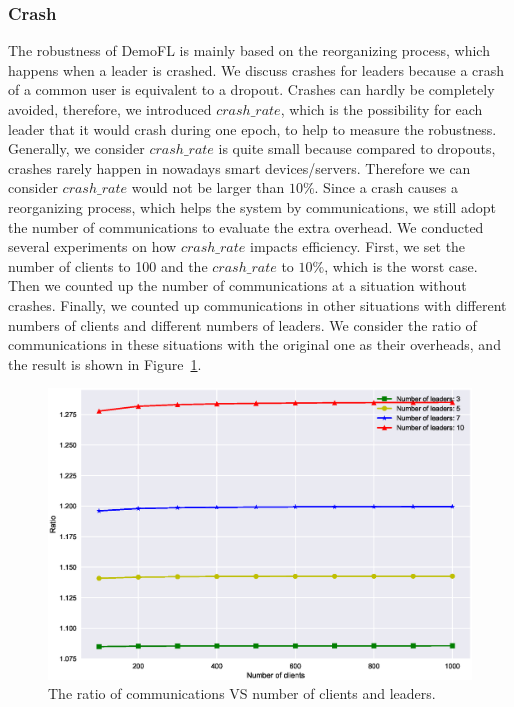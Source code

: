 \subsubsection{Crash}
The robustness of DemoFL is mainly based on the reorganizing process, which happens when a leader is crashed. We discuss crashes for leaders because a crash of a common user is equivalent to a dropout. Crashes can hardly be completely avoided, therefore, we introduced $crash\_rate$, which is the possibility for each leader that it would crash during one epoch, to help to measure the robustness. Generally, we consider $crash\_rate$ is quite small because compared to dropouts, crashes rarely happen in nowadays smart devices/servers. Therefore we can consider $crash\_rate$ would not be larger than $10\%$. Since a crash causes a reorganizing process, which helps the system by communications, we still adopt the number of communications to evaluate the extra overhead. We conducted several experiments on how $crash\_rate$ impacts efficiency. First, we set the number of clients to 100 and the $crash\_rate$ to $10\%$, which is the worst case. Then we counted up the number of communications at a situation without crashes. Finally, we counted up communications in other situations with different numbers of clients and different numbers of leaders. We consider the ratio of communications in these situations with the original one as their overheads, and the result is shown in Figure~\ref{crash-leader}. 

\begin{figure}[!ht]
    \centering
    \includegraphics[width=\columnwidth]{img/crash-leader.eps}
    \caption{The ratio of communications VS number of clients and leaders.}
    \label{crash-leader}
\end{figure}

